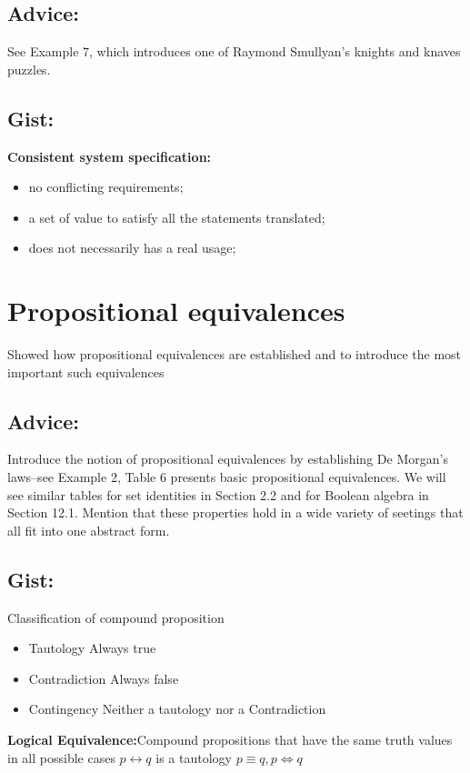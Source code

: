 \documentclass[none,green,normal,cn]{elegantnote}
\begin{document}
\subsection{Advice:}
See Example 7, which introduces one of Raymond Smullyan's knights and knaves puzzles.
\subsection{Gist:}
\textbf{Consistent system specification:} 
\begin{itemize}
  \item no conflicting requirements;
  \item a set of value to satisfy all the statements translated;
  \item does not necessarily has a real usage;
\end{itemize}

\section{Propositional equivalences}
Showed how propositional equivalences are established and to introduce the most important such equivalences
\subsection{Advice:}
Introduce the notion of propositional equivalences by establishing De Morgan's laws--see Example 2, Table 6 presents basic propositional equivalences.
We will see similar tables for set identities in Section 2.2 and for Boolean algebra in Section 12.1.
Mention that these properties hold in a wide variety of seetings that all fit into one abstract form.
\subsection{Gist:}
Classification of compound proposition
\begin{itemize}
  \item Tautology \qquad Always true
  \item Contradiction \qquad Always false
  \item Contingency \qquad Neither a tautology nor a Contradiction
\end{itemize}
\textbf{Logical Equivalence:}Compound propositions that have the same truth values in all possible cases
\(p \leftrightarrow q\) is a tautology
\(p \equiv q, p \Leftrightarrow q\)
\end{document}
